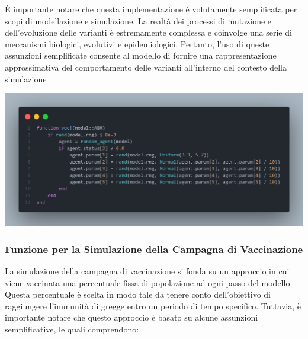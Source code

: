 È importante notare che questa implementazione è volutamente 
semplificata per scopi di modellazione e simulazione. 
La realtà dei processi di mutazione e dell'evoluzione delle varianti è 
estremamente complessa e coinvolge una serie di meccanismi biologici, 
evolutivi e epidemiologici. Pertanto, l'uso di queste assunzioni 
semplificate consente al modello di fornire una rappresentazione 
approssimativa del comportamento delle varianti all'interno del 
contesto della simulazione \cite{Abavisani2022} \cite{Markov2023} 
\cite{https://doi.org/10.1002/jmv.27331} 

\begin{minipage}{\linewidth}
	\centering
	\includegraphics[width=\textwidth]{img/voc.png}
	\label{fig:voc}
\end{minipage}

\subsubsection{Funzione per la Simulazione della Campagna di Vaccinazione}

La simulazione della campagna di vaccinazione si fonda su un approccio 
in cui viene vaccinata una percentuale fissa di popolazione ad ogni 
passo del modello. Questa percentuale è scelta in modo tale da tenere 
conto dell'obiettivo di raggiungere l'immunità di gregge entro un 
periodo di tempo specifico. Tuttavia, è importante notare che questo 
approccio è basato su alcune assunzioni semplificative, le quali 
comprendono:

